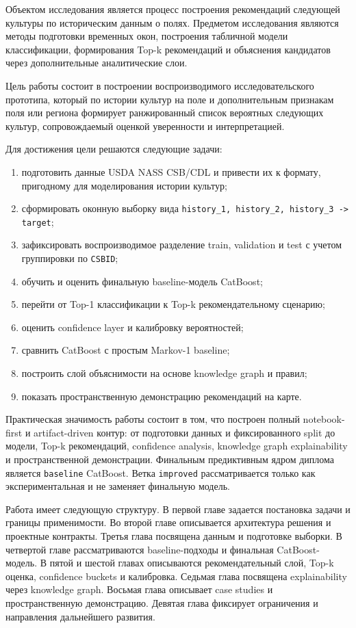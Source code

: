 \documentclass[a4paper,article,14pt]{extarticle}
\begin{document}
Объектом исследования является процесс построения рекомендаций следующей культуры по историческим данным о полях. Предметом исследования являются методы подготовки временных окон, построения табличной модели классификации, формирования Top-k рекомендаций и объяснения кандидатов через дополнительные аналитические слои.

Цель работы состоит в построении воспроизводимого исследовательского прототипа, который по истории культур на поле и дополнительным признакам поля или региона формирует ранжированный список вероятных следующих культур, сопровождаемый оценкой уверенности и интерпретацией.

Для достижения цели решаются следующие задачи:
\begin{enumerate}
    \item подготовить данные USDA NASS CSB/CDL и привести их к формату, пригодному для моделирования истории культур;
    \item сформировать оконную выборку вида \texttt{history\_1, history\_2, history\_3 -> target};
    \item зафиксировать воспроизводимое разделение train, validation и test с учетом группировки по \texttt{CSBID};
    \item обучить и оценить финальную baseline-модель CatBoost;
    \item перейти от Top-1 классификации к Top-k рекомендательному сценарию;
    \item оценить confidence layer и калибровку вероятностей;
    \item сравнить CatBoost с простым Markov-1 baseline;
    \item построить слой объяснимости на основе knowledge graph и правил;
    \item показать пространственную демонстрацию рекомендаций на карте.
\end{enumerate}

Практическая значимость работы состоит в том, что построен полный notebook-first и artifact-driven контур: от подготовки данных и фиксированного split до модели, Top-k рекомендаций, confidence analysis, knowledge graph explainability и пространственной демонстрации. Финальным предиктивным ядром диплома является \texttt{baseline} CatBoost. Ветка \texttt{improved} рассматривается только как экспериментальная и не заменяет финальную модель.

Работа имеет следующую структуру. В первой главе задается постановка задачи и границы применимости. Во второй главе описывается архитектура решения и проектные контракты. Третья глава посвящена данным и подготовке выборки. В четвертой главе рассматриваются baseline-подходы и финальная CatBoost-модель. В пятой и шестой главах описываются рекомендательный слой, Top-k оценка, confidence buckets и калибровка. Седьмая глава посвящена explainability через knowledge graph. Восьмая глава описывает case studies и пространственную демонстрацию. Девятая глава фиксирует ограничения и направления дальнейшего развития.
\end{document}
